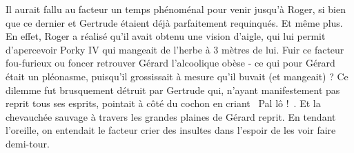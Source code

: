 \documentclass[a5paper, 10pt, twoside]{book}
\newcommand{\cg}{\guillemotleft~}
\newcommand{\cd}{~\guillemotright}
\begin{document}
Il aurait fallu au facteur un temps phénoménal pour venir jusqu'à Roger, si bien que ce dernier et Gertrude étaient déjà parfaitement requinqués. Et même plus. En effet, Roger a réalisé qu'il avait obtenu une vision d'aigle, qui lui permit d'apercevoir Porky IV qui mangeait de l'herbe à 3 mètres de lui. Fuir ce facteur fou-furieux ou foncer retrouver Gérard l'alcoolique obèse - ce qui pour Gérard était un pléonasme, puisqu'il grossissait à mesure qu'il buvait (et mangeait) ? Ce dilemme fut brusquement détruit par Gertrude qui, n'ayant manifestement pas reprit tous ses esprits, pointait à côté du cochon en criant \cg Pal lô !\cd. Et la chevauchée sauvage à travers les grandes plaines de Gérard reprit. En tendant l'oreille, on entendait le facteur crier des insultes dans l'espoir de les voir faire demi-tour.
\end{document}

